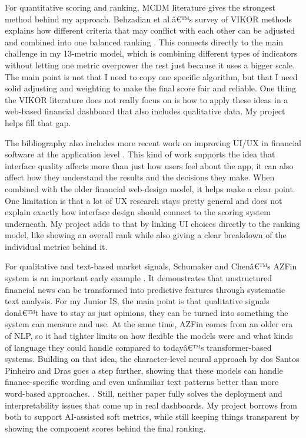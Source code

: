 \documentclass[12pt]{article}
\begin{document}
For quantitative scoring and ranking, MCDM literature gives the strongest method behind my approach. Behzadian et al.â€™s survey of VIKOR methods explains how different criteria that may conflict with each other can be adjusted and combined into one balanced ranking \cite{behzadian2012vikor}. This connects directly to the main challenge in my 13-metric model, which is combining different types of indicators without letting one metric overpower the rest just because it uses a bigger scale. The main point is not that I need to copy one specific algorithm, but that I need solid adjusting and weighting to make the final score fair and reliable. One thing the VIKOR literature does not really focus on is how to apply these ideas in a web-based financial dashboard that also includes qualitative data. My project helps fill that gap.

The bibliography also includes more recent work on improving UI/UX in financial software at the application level \cite{runsewe2024optimizing}. This kind of work supports the idea that interface quality affects more than just how users feel about the app, it can also affect how they understand the results and the decisions they make. When combined with the older financial web-design model, it helps make a clear point. One limitation is that a lot of UX research stays pretty general and does not explain exactly how interface design should connect to the scoring system underneath. My project adds to that by linking UI choices directly to the ranking model, like showing an overall rank while also giving a clear breakdown of the individual metrics behind it.

For qualitative and text-based market signals, Schumaker and Chenâ€™s AZFin system is an important early example \cite{Schumaker2009Textual}. It demonstrates that unstructured financial news can be transformed into predictive features through systematic text analysis. For my Junior IS, the main point is that qualitative signals donâ€™t have to stay as just opinions, they can be turned into something the system can measure and use. At the same time, AZFin comes from an older era of NLP, so it had tighter limits on how flexible the models were and what kinds of language they could handle compared to todayâ€™s transformer-based systems.
Building on that idea, the character-level neural approach by dos Santos Pinheiro and Dras goes a step further, showing that these models can handle finance-specific wording and even unfamiliar text patterns better than more word-based approaches.
\cite{dos-santos-pinheiro-dras-2017-stock}. Still, neither paper fully solves the deployment and interpretability issues that come up in real dashboards. My project borrows from both to support AI-assisted soft metrics, while still keeping things transparent by showing the component scores behind the final ranking.
\end{document}
